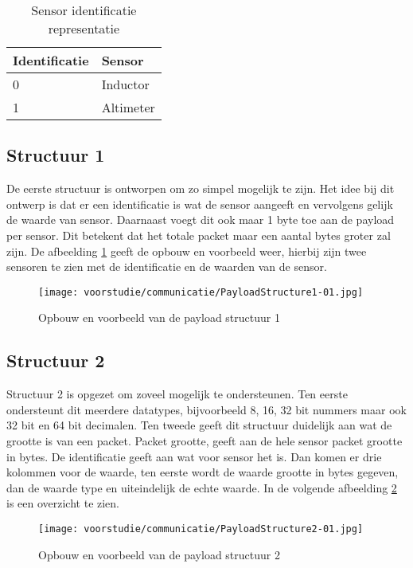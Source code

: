 \begin{table}[h!]
	\centering
	\caption{Sensor identificatie representatie}
	\label{tab:SensorRep}
	\begin{tabular}{p{4cm}p{6cm}}
	\toprule
	Identificatie & Sensor        \\ \midrule
	0      & Inductor  \\
	1      & Altimeter \\ \bottomrule
	\end{tabular}%
\end{table}

\subsection{Structuur 1}
De eerste structuur is ontworpen om zo simpel mogelijk te zijn. Het idee bij dit ontwerp is dat er een identificatie is wat de sensor aangeeft en vervolgens gelijk de waarde van sensor. Daarnaast voegt dit ook maar 1 byte toe aan de payload per sensor. Dit betekent dat het totale packet maar een aantal bytes groter zal zijn. De afbeelding \ref{fig:Structure1} geeft de opbouw en voorbeeld weer, hierbij zijn twee sensoren te zien met de identificatie en de waarden van de sensor.
\begin{figure}[h!]
	\centering
	\label{fig:Structure1}


	\texttt{[image: voorstudie/communicatie/PayloadStructure1-01.jpg]}
	\caption{Opbouw en voorbeeld van de payload structuur 1}
\end{figure}

\newpage
\subsection{Structuur 2}
Structuur 2 is opgezet om zoveel mogelijk te ondersteunen. Ten eerste ondersteunt dit meerdere datatypes, bijvoorbeeld 8, 16, 32 bit nummers maar ook 32 bit en 64 bit decimalen. Ten tweede geeft dit structuur duidelijk aan wat de grootte is van een packet. Packet grootte, geeft aan de hele sensor packet grootte in bytes. De identificatie geeft aan wat voor sensor het is. Dan komen er drie kolommen voor de waarde, ten eerste wordt de waarde grootte in bytes gegeven, dan de waarde type en uiteindelijk de echte waarde. In de volgende afbeelding \ref{fig:Structure2} is een overzicht te zien.
\begin{figure}[h!]
	\centering
	\label{fig:Structure2}

	\texttt{[image: voorstudie/communicatie/PayloadStructure2-01.jpg]}
	\caption{Opbouw en voorbeeld van de payload structuur 2}
\end{figure}

